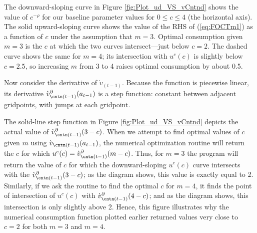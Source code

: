 \documentclass[titlepage, headings=optiontotocandhead]{econark}
\begin{document}
{The downward-sloping curve in Figure \ref{fig:Plot_ud_VS_vCntnd}
shows the value of $c^{-\rho}$ for our baseline parameter values
for $0 \leq c \leq 4$ (the horizontal axis).  The solid
upward-sloping curve shows the value of the RHS of (\ref{eq:FOCTm1})
as a function of $c$ under the assumption that $m=3$.
Optimal consumption given $m=3$ is the $c$ at which the two curves intersect---just below $c=2$.
The dashed curve shows the same for $m=4$; its intersection with $u^{c}(c)$ is slightly below $c=2.5$, so increasing $m$ from 3 to 4 raises optimal consumption by about 0.5.

Now consider the derivative of $\grave{v}_{(t-1)}$.  Because the function is piecewise linear, its derivative $\grave{v}_{{\cntn}(t-1)}^{\partial}(a_{t-1})$ is a step function: constant between adjacent gridpoints, with jumps at each gridpoint.

The solid-line step function in Figure \ref{fig:Plot_ud_VS_vCntnd} depicts the actual value of
$\grave{v}_{{\cntn}(t-1)}^{\partial}(3-c)$.  When we attempt to find optimal values of
$c$ given $m$ using $\grave{v}_{{\cntn}(t-1)}(a_{t-1})$, the numerical optimization routine will
return the $c$ for which
$u^{c}(c) = \grave{v}^{\partial}_{{\cntn}(t-1)}(m-c)$.  Thus, for
$m=3$ the program will return the value of $c$ for which the downward-sloping
$u^{c}(c)$ curve intersects with the
$\grave{v}_{{\cntn}(t-1)}^{\partial}(3-c)$; as the diagram shows, this value is exactly equal to 2.
Similarly, if we ask the routine to find the optimal $c$ for $m=4$, it finds the point of
intersection of $u^{c}(c)$ with $\grave{v}_{{\cntn}(t-1)}^{\partial}(4-c)$; and as the diagram shows, this
intersection is only slightly above 2.  Hence, this figure illustrates why the numerical consumption
function plotted earlier returned values very close to $c=2$ for both $m=3$ and $m=4$.

}
\end{document}
